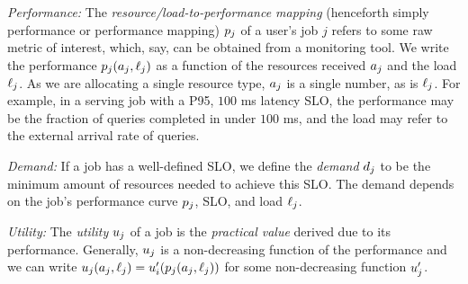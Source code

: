 \emph{Performance:}
The \emph{resource/load-to-performance mapping} (henceforth simply performance or performance mapping)
$p_{j}$  of a user's job $j$ refers to some raw metric of interest, which, say, can
be obtained from a monitoring tool.
We write the performance $p_{j}(a_{j}, \ell_{j})$ as a function of the resources received
$a_{j}$ and the load $\ell_{j}$.
As we are allocating a single resource type, $a_{j}$ is a single number,
as is $\ell_{j}$.
For example, in a serving job with a P95, $100$ ms latency SLO,
the performance may be the fraction of queries completed in under $100$ ms,
and the load may refer to the external arrival  rate of queries.

\emph{Demand:}
If a job has a well-defined SLO, we define the
\emph{demand} $d_{j}$ to be the
minimum amount of resources needed to achieve this SLO.
The demand depends on the job's performance curve $p_{j}$, SLO, and load $\ell_{j}$.




\label{sec:utilities}


\emph{Utility:} The \emph{utility} $u_{j}$ of a job is the
\emph{practical value} derived due to its performance.
Generally, $u_{j}$ is a non-decreasing function of
the performance and we can write
$u_{j}(a_{j},\ell_{j}) = u'_{i}(p_{j}(a_{j},\ell_{j}))$ for some non-decreasing function
$u'_{j}$.
% 

